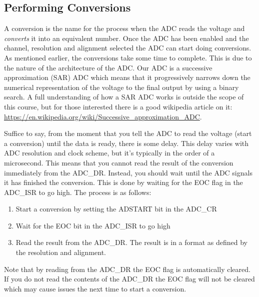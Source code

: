 \subsection{Performing Conversions}
A conversion is the name for the process when the ADC reads the voltage and \emph{converts} it into an equivalent number.
Once the ADC has been enabled and the channel, resolution and alignment selected the ADC can start doing conversions. As mentioned earlier, the conversions take some time to complete. This is due to the nature of the architecture of the ADC. Our ADC is a successive approximation (SAR) ADC which means that it progressively narrows down the numerical representation of the voltage to the final output by using a binary search. A full understanding of how a SAR ADC works is outside the scope of this course, but for those interested there is a good wikipedia article on it: \url{https://en.wikipedia.org/wiki/Successive_approximation_ADC}. 

Suffice to say, from the moment that you tell the ADC to read the voltage (start a conversion) until the data is ready, there is some delay. This delay varies with ADC resolution and clock scheme, but it's typically in the order of a microsecond. This means that you cannot read the result of the conversion immediately from the ADC\_DR. Instead, you should wait until the ADC signals it has finished the conversion. This is done by waiting for the EOC flag in the ADC\_ISR to go high. The process is as follows:
\begin{enumerate}
\item Start a conversion by setting the ADSTART bit in the ADC\_CR
\item Wait for the EOC bit in the ADC\_ISR to go high
\item Read the result from the ADC\_DR. The result is in a format as defined by the resolution and alignment. 
\end{enumerate}
Note that by reading from the ADC\_DR the EOC flag is automatically cleared. If you do not read the contents of the ADC\_DR the EOC flag will not be cleared which may cause issues the next time to start a conversion. 



